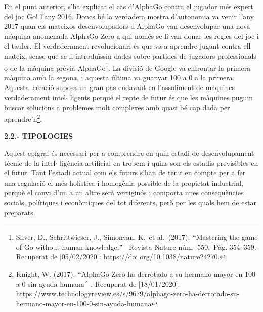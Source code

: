 \documentclass[12pt]{article}
\begin{document}
\vspace{\baselineskip}
\begin{justify}
En el punt anterior, s’ha explicat el cas d’AlphaGo contra el jugador més expert del joc Go! l’any 2016. Doncs bé la verdadera mostra d’autonomia va venir l’any 2017 quan els mateixos desenvolupadors d’AlphaGo van desenvolupar una nova màquina anomenada AlphaGo Zero a qui només se li van donar les regles del joc i el tauler. El verdaderament revolucionari és que va a aprendre jugant contra ell mateix, sense que se li introduïssin dades sobre partides de jugadors professionals o de la màquina prèvia AlphaGo\footnote{ Silver, D., Schrittwieser, J., Simonyan, K. et al. (2017). $``$Mastering the game of Go without human knowledge.$"$  Revista Nature núm. 550. Pàg. 354–359. Recuperat de [05/02/2020]: https://doi.org/10.1038/nature24270.  }. La divisió de Google va enfrontar la primera màquina amb la segona, i aquesta última va guanyar 100 a 0 a la primera.  Aquesta\ creació suposa un gran pas endavant  en l’assoliment de màquines verdaderament intel$ \cdot $ ligents perquè el repte de futur és que les màquines puguin buscar solucions a problemes molt complexes amb quasi bé cap dada per aprendre’n\footnote{ Knight, W. (2017). $``$AlphaGo Zero ha derrotado a su hermano mayor en 100 a 0 sin ayuda humana$"$ .  Recuperat de [18/01/2020]: https://www.technologyreview.es/s/9679/alphago-zero-ha-derrotado-su-hermano-mayor-en-100-0-sin-ayuda-humana }. 
\end{justify}\par


\vspace{\baselineskip}
\begin{justify}
\textbf{2.2.- TIPOLOGIES}
\end{justify}\par


\vspace{\baselineskip}
\begin{justify}
Aquest epígraf és necessari per a comprendre en quin estadi de desenvolupament tècnic de la intel$ \cdot $ ligència artificial en trobem i quins son els estadis previsibles en el futur. Tant l’estadi actual com els futurs s’han de tenir en compte per a fer una regulació el més holística i homogènia possible de la propietat industrial, perquè el canvi d’un a un altre serà vertiginós i comporta unes conseqüències socials, polítiques i econòmiques del tot diferents, però per les quals hem de estar preparats.
\end{justify}\par
\end{document}

